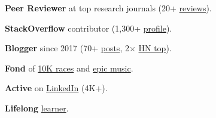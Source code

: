 \documentclass{cesar}
\begin{document}
\textbf{Peer Reviewer} at top research journals (20+ \href{https://www.cesarsotovalero.net/service#academic-reviewer}{reviews}).

\textbf{StackOverflow}  contributor (1,300+ \href{https://stackoverflow.com/users/10480869/cesarsotovalero}{profile}).

\textbf{Blogger} since 2017 (70+ \href{https://www.cesarsotovalero.net/blog}{posts}, 2$\times$ \href{https://news.ycombinator.com/favorites?id=cesarsotovalero}{HN top}).

\textbf{Fond} of \href{https://www.cesarsotovalero.net/races.html}{10K races} and \href{https://open.spotify.com/playlist/1E4xBA3IYuTjtTphOV16FM}{epic music}.

\textbf{Active} on \href{https://www.cesarsotovalero.net/linkedin}{LinkedIn} (4K+).

\textbf{Lifelong} \href{https://www.cesarsotovalero.net/courses.html}{learner}.
\end{document}
